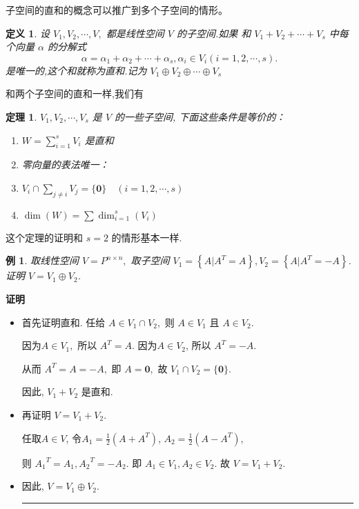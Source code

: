\documentclass[13pt]{beamer}
\newtheorem{thm}{定理}
\newtheorem{exa}{例}
\newtheorem*{defi}{定义}
\def\qed{\nopagebreak\hfill{\rule{4pt}{7pt}}\medbreak}
\def\pf{{\bf 证明~~ }}
\def\dim{\operatorname{dim}}
\def\0{\mathbf{0}}
\begin{document}
\begin{frame}
\small{
子空间的直和的概念可以推广到多个子空间的情形。 
\begin{defi}
设 $V_{1}, V_{2}, \cdots, V,$ 都是线性空间 $V$ 的子空间.如果
和 $V_{1}+V_{2}+\cdots+V_{s}$ 中每个向量 ${\alpha}$ 的分解式
\[
{\alpha}={\alpha}_{1}+{\alpha}_{2}+\cdots+{\alpha}_{s}, {\alpha}_{i} \in V_{i}(i=1,2, \cdots, s).
\]
是唯一的,这个和就称为直和.记为 $V_{1} \oplus V_{2} \oplus \cdots \oplus V_{s}$
\end{defi}



和两个子空间的直和一样,我们有 

\begin{thm}
$V_{1}, V_{2}, \cdots, V_{s}$ 是 $V$ 的一些子空间, 下面这些条件是等价的：
\begin{enumerate}
\item $W=\sum_{i=1}^s V_{i}$ 是直和
\item 零向量的表法唯一：
\item $V_i \cap \sum_{j \neq i} V_j =\{\mathbf{0}\} \quad(i=1,2, \cdots, s)$
\item  $\dim ( W)= \sum \dim_{i=1}^s \left(V_{i}\right)$
\end{enumerate}
\end{thm} 
这个定理的证明和 $s=2$ 的情形基本一样.}
\end{frame}


\begin{frame}
\begin{exa}
取线性空间 $V=P^{n \times n},$ 取子空间 $V_{1}=\left\{A | A^{T}=A\right\}, V_{2}=\left\{A | A^{T}=-A\right\}$. 证明 $V=V_{1} \oplus V_{2}$.
\end{exa}
\pf 
\begin{itemize}
\item 首先证明直和.
 任给 $A \in V_{1} \cap V_{2},$ 则 $A \in V_{1}$ 且 $A \in V_{2}.$ 
 
 因为$A \in V_{1},$ 所以 $A^{T}=A.$ 因为$A \in V_{2}$, 所以 $A^{T}=-A.$ 
 
 从而
$A^{T}=A=-A,$ 即 $A=\0,$ 故 $V_{1} \cap V_{2}=\{\0\}$.

 因此, $V_{1}+V_{2}$ 是直和.
\item 再证明 $V=V_{1}+V_{2}.$

任取$A\in V$, 
令$A_1= \frac{1}{2}(A+A^{T})$, $A_2=\frac{1}{2}(A-A^{T})$, 

则
${A_1}^{T}={A_1}, {A_2}^{T}=-{A_2}$. 即 $A_1 \in V_1, A_2 \in V_2.$ 
故 $V=V_{1}+V_{2}$.
\item 因此, $V=V_{1} \oplus V_{2}$. \qed
\end{itemize}

\end{frame}
\end{document}
